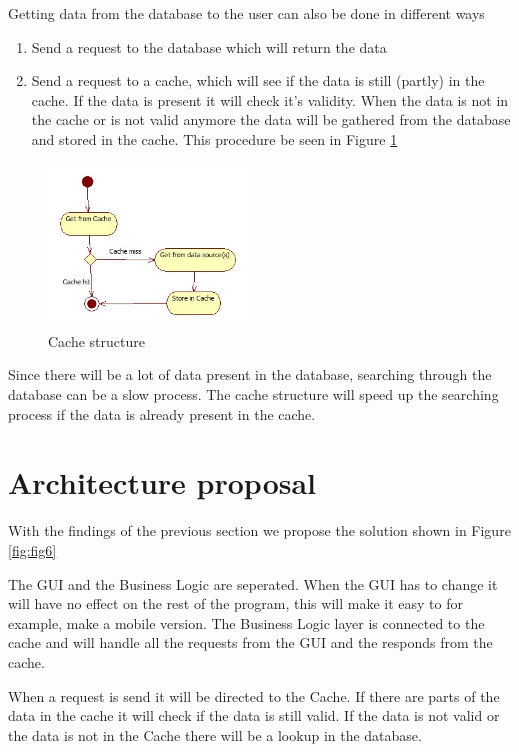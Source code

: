 \documentclass{article}
\begin{document}
Getting data from the database to the user can also be done in different ways
\begin{enumerate}
\item Send a request to the database which will return the data
\item Send a request to a cache, which will see if the data is still (partly) in the cache. If the data is present it will check it's validity. When the data is not in the cache or is not valid anymore the data will be gathered from the database and stored in the cache.  This procedure be seen in Figure \ref{fig:fig5}
\end{enumerate}

\begin{figure}[!]
\centering
\includegraphics[width=200px]{Cached}
\caption{Cache structure}
\label{fig:fig5}
\end{figure}

Since there will be a lot of data present in the database, searching through the database can be a slow process. The cache structure will speed up the searching process if the data is already present in the cache. 
\section*{Architecture proposal}

With the findings of the previous section we propose the solution shown in Figure \ref{fig:fig6}

The GUI and the Business Logic are seperated. When the GUI has to change it will have no effect on the rest of the program, this will make it easy to for example, make a mobile version. The Business Logic layer is connected to the cache and will handle all the requests from the GUI and the responds from the cache. 

When a request is send it will be directed to the Cache. If there are parts of the data in the cache it will check if the data is still valid. If the data is not valid or the data is not in the Cache there will be a lookup in the database.
\end{document}
